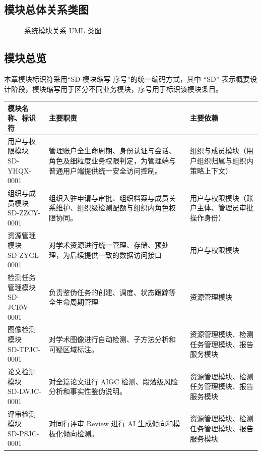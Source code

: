 \subsection{模块总体关系类图}
\begin{figure}[H]
    \centering
    \resizebox{0.98\textwidth}{!}{}
    \caption{系统模块关系 UML 类图}
\end{figure}

\subsection{模块总览}
\noindent 本章模块标识符采用“SD-模块缩写-序号”的统一编码方式，其中 ``SD'' 表示概要设计阶段，模块缩写用于区分不同业务模块，序号用于标识该模块条目。

\begin{longtable}{|p{3.8cm}|p{6.1cm}|p{4.1cm}|}
\hline
模块名称、标识符 & 主要职责 & 主要依赖 \\ \hline
\shortstack[l]{用户与权限模块\\SD-YHQX-0001} & 管理账户全生命周期、身份认证与会话、角色及细粒度业务权限判定，为管理端与普通用户端提供统一安全访问控制。 & 组织与成员模块（用户组织归属与组织内策略上下文） \\ \hline
\shortstack[l]{组织与成员模块\\SD-ZZCY-0001} & 组织入驻申请与审批、组织档案与成员关系维护、组织级检测配额与组织内角色权限协同。 & 用户与权限模块（账户主体、管理员审批操作身份） \\ \hline
\shortstack[l]{资源管理模块\\SD-ZYGL-0001} & 对学术资源进行统一管理、存储、预处理，为后续提供一致的数据访问接口 & 用户与权限模块 \\ \hline
\shortstack[l]{检测任务管理模块\\SD-JCRW-0001} & 负责鉴伪任务的创建、调度、状态跟踪等全生命周期管理 & 资源管理模块 \\ \hline
\shortstack[l]{图像检测模块\\SD-TPJC-0001} & 对学术图像进行自动检测、子方法分析和可疑区域标注。 & 资源管理模块、检测任务管理模块、报告服务模块 \\ \hline
\shortstack[l]{论文检测模块\\SD-LWJC-0001} & 对全篇论文进行 AIGC 检测、段落级风险分析和事实性鉴伪说明。 & 资源管理模块、检测任务管理模块、报告服务模块 \\ \hline
\shortstack[l]{评审检测模块\\SD-PSJC-0001} & 对同行评审 Review 进行 AI 生成倾向和模板化倾向检测。 & 资源管理模块、检测任务管理模块、报告服务模块 \\ \hline

\end{longtable}
